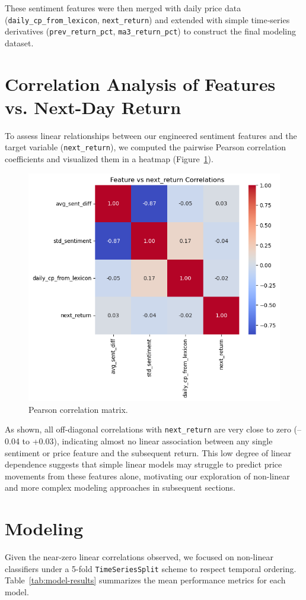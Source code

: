 \documentclass[11pt,a4paper]{article}
\begin{document}
These sentiment features were then merged with daily price data (\texttt{daily\_cp\_from\_lexicon}, \texttt{next\_return}) and extended with simple time‐series derivatives (\texttt{prev\_return\_pct}, \texttt{ma3\_return\_pct}) to construct the final modeling dataset.  


\section{Correlation Analysis of Features vs. Next-Day Return}

To assess linear relationships between our engineered sentiment features and the target variable (\texttt{next\_return}), we computed the pairwise Pearson correlation coefficients and visualized them in a heatmap (Figure~\ref{fig:correlation-heatmap}).

\begin{figure}[h]
  \centering
  \includegraphics[width=0.5\linewidth]{output.png}
  \caption{Pearson correlation matrix.}
  \label{fig:correlation-heatmap}
\end{figure}

As shown, all off-diagonal correlations with \texttt{next\_return} are very close to zero (–0.04 to +0.03), indicating almost no linear association between any single sentiment or price feature and the subsequent return. This low degree of linear dependence suggests that simple linear models may struggle to predict price movements from these features alone, motivating our exploration of non-linear and more complex modeling approaches in subsequent sections.


\section{Modeling}

Given the near-zero linear correlations observed, we focused on non-linear classifiers under a 5-fold \texttt{TimeSeriesSplit} scheme to respect temporal ordering. Table~\ref{tab:model-results} summarizes the mean performance metrics for each model.
\end{document}
